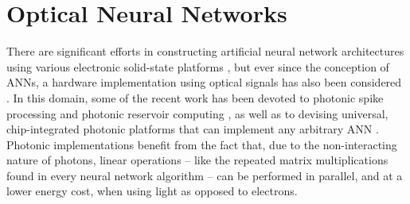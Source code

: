 \section{Optical Neural Networks}



There are significant efforts in constructing artificial neural network architectures using various electronic solid-state platforms \cite{Merolla2014,Prezioso2015}, but ever since the conception of ANNs, a hardware implementation using optical signals has also been considered \cite{Abu-Mostafa1987, Jutamulia1996}. In this domain, some of the recent work has been devoted to photonic spike processing \cite{Rosenbluth2009, Tait2014} and photonic reservoir computing \cite{Brunner2013, Vandoorne2014}, as well as to devising universal, chip-integrated photonic platforms that can implement any arbitrary ANN \cite{Shainline2017, Shen2017}.  Photonic implementations benefit from the fact that, due to the non-interacting nature of photons, linear operations -- like the repeated matrix multiplications found in every neural network algorithm -- can be performed in parallel, and at a lower energy cost, when using light as opposed to electrons. 

